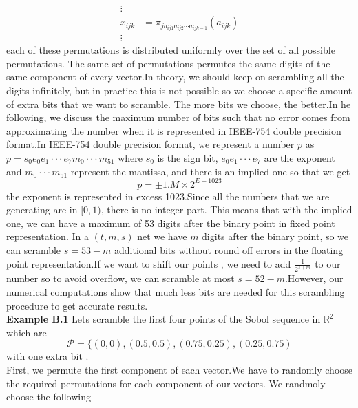\documentclass{article}
\theoremstyle{definition}
\begin{document}
\begin{appendices}
\begin{align*}
\vdots\\
x_{ijk}&=\pi_{ja_{ij1}a_{ij2}\cdots a_{ijk-1}}(a_{ijk})\\
\vdots
\end{align*}
\noindent each of these permutations is distributed uniformly over the set of all possible permutations. The same set of permutations permutes the same digits of the same component of every vector.In theory, we should keep on scrambling all the digits infinitely, but in practice this is not possible so we choose a specific amount of extra bits that we want to scramble. The more bits we choose, the better.In he following, we discuss the maximum number of bits such that no error comes from approximating the number when it is represented in IEEE-754 double precision format.In IEEE-754 double precision format, we represent a number $p$ as \(p=s_0e_0e_1\cdot\cdot\cdot e_7m_0\cdot\cdot\cdot m_{51}\) where $s_0$ is the sign bit, $e_0e_1\cdot\cdot\cdot e_7$ are the exponent and $m_0\cdot\cdot\cdot m_{51}$ represent the mantissa,
and there is an implied one so that we get \begin{equation}
    p=\pm 1.M\times 2^{ E-1023}
\end{equation}
the exponent is represented in excess 1023.Since all the numbers that we are generating are in $ [0,1)$, there is no integer part. This means that with the implied one, we can have a maximum of 53 digits after the binary point in fixed point representation. In a $(t,m,s)$ net we have $m$ digits after the binary point, so we can scramble $s=53-m$ additional bits without round off errors in the floating point representation.If we want to shift our points , we need to add $\frac{1}{2^{s+m}}$ to our number so to avoid overflow, we can scramble at most $s=52-m$.However, our numerical computations show that much less bits are needed for this scrambling procedure to get accurate results.\\
\noindent\textbf{Example B.1 }Lets scramble the first four points of the Sobol sequence in $\mathbb{R}^2$ which are\begin{equation}
    \mathcal{P}=\{(0,0),(0.5,0.5),(0.75,0.25),(0.25,0.75)
\end{equation} with one extra bit .\\
First, we permute the first component of each vector.We have to randomly choose the required permutations for each component of our vectors. We randmoly choose the following \begin{table}[H]
\centering
\begin{tabular}{ccccccc}

\end{tabular}
\end{table}
\end{appendices}
\end{document}
